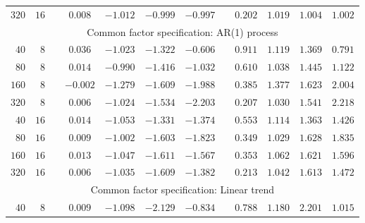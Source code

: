 \documentclass[12pt,fleqn]{article}
\begin{document}
\begin{table}[H]
\begin{tabular}{rrcccccccccc}
   {\small $320$} & {\small $16$} & {\small $$} & {\small $0.008$} & {\small $-1.012$} & {\small $-0.999$} & {\small $-0.997$} & {\small $$} & {\small $0.202$} & {\small $1.019$} & {\small $1.004$} & {\small $1.002$} \\
   \multicolumn{12}{c}{\small Common factor specification: AR(1) process}\\
   {\small $40$} & {\small $8$} & {\small $$} & {\small $0.036$} & {\small $-1.023$} & {\small $-1.322$} & {\small $-0.606$} & {\small $$} & {\small $0.911$} & {\small $1.119$} & {\small $1.369$} & {\small $0.791$} \\
   {\small $80$} & {\small $8$} & {\small $$} & {\small $0.014$} & {\small $-0.990$} & {\small $-1.416$} & {\small $-1.032$} & {\small $$} & {\small $0.610$} & {\small $1.038$} & {\small $1.445$} & {\small $1.122$} \\
   {\small $160$} & {\small $8$} & {\small $$} & {\small $-0.002$} & {\small $-1.279$} & {\small $-1.609$} & {\small $-1.988$} & {\small $$} & {\small $0.385$} & {\small $1.377$} & {\small $1.623$} & {\small $2.004$} \\
   {\small $320$} & {\small $8$} & {\small $$} & {\small $0.006$} & {\small $-1.024$} & {\small $-1.534$} & {\small $-2.203$} & {\small $$} & {\small $0.207$} & {\small $1.030$} & {\small $1.541$} & {\small $2.218$} \\
   {\small $40$} & {\small $16$} & {\small $$} & {\small $0.014$} & {\small $-1.053$} & {\small $-1.331$} & {\small $-1.374$} & {\small $$} & {\small $0.553$} & {\small $1.114$} & {\small $1.363$} & {\small $1.426$} \\
   {\small $80$} & {\small $16$} & {\small $$} & {\small $0.009$} & {\small $-1.002$} & {\small $-1.603$} & {\small $-1.823$} & {\small $$} & {\small $0.349$} & {\small $1.029$} & {\small $1.628$} & {\small $1.835$} \\
   {\small $160$} & {\small $16$} & {\small $$} & {\small $0.013$} & {\small $-1.047$} & {\small $-1.611$} & {\small $-1.567$} & {\small $$} & {\small $0.353$} & {\small $1.062$} & {\small $1.621$} & {\small $1.596$} \\
   {\small $320$} & {\small $16$} & {\small $$} & {\small $0.006$} & {\small $-1.035$} & {\small $-1.609$} & {\small $-1.382$} & {\small $$} & {\small $0.213$} & {\small $1.042$} & {\small $1.613$} & {\small $1.472$} \\
   \multicolumn{12}{c}{\small Common factor specification: Linear trend}\\
   {\small $40$} & {\small $8$} & {\small $$} & {\small $0.009$} & {\small $-1.098$} & {\small $-2.129$} & {\small $-0.834$} & {\small $$} & {\small $0.788$} & {\small $1.180$} & {\small $2.201$} & {\small $1.015$} \\

\end{tabular}
\end{table}
\end{document}
